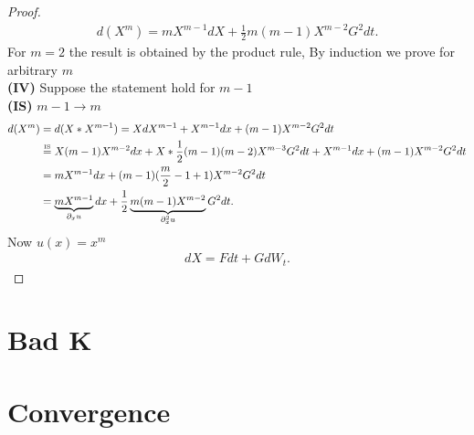 \begin{proof}
 \begin{align*}
  d(X^{m} ) = mX^{m-1} dX + \frac{1}{2}m(m-1) X^{m-2} G^2dt
 .\end{align*}
 For $m=2$ the result is obtained by the product rule, By induction we prove for arbitrary $m$ \\[1ex]
 \textbf{(IV)} Suppose the statement hold for $m-1$ \\
 \textbf{(IS)} $m-1 \to  m$
 \begin{align*}
   d(X^{m} ) &= d(X*X^{m-1} ) = XdX^{m-1}  + X^{m-1} dx + (m-1)X^{m-2} G^2 dt\\
             &\myS{IS}{=} X(m-1)X^{m-2}  dx + X*\frac{1}{2}(m-1)(m-2)X^{m-3}G^2dt +X^{m-1} dx + (m-1)X^{m-2}G^2 dt  \\
             &= mX^{m-1} dx + (m-1)(\frac{m}{2}-1+1)X^{m-2}G^2   dt \\
             &= \underbrace{mX^{m-1}}_{\partial_x u}dx + \frac{1}{2} \underbrace{m(m-1)X^{m-2}}_{\partial^2_x u} G^2dt  
 .\end{align*}
 Now $u(x) =x^{m}  $
 \begin{align*}
  dX  =F dt + G dW_t
 .\end{align*}
\end{proof}
\section{Bad K}
\section{Convergence}
